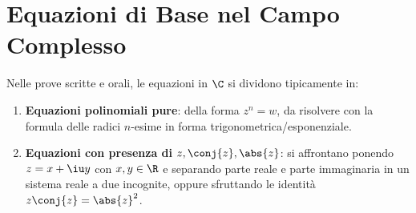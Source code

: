 \section{Equazioni di Base nel Campo Complesso}
\begin{esame}
Nelle prove scritte e orali, le equazioni in $\C$ si dividono tipicamente in:
\begin{enumerate}
    \item \textbf{Equazioni polinomiali pure}: della forma $z^n = w$, da risolvere con la formula delle radici $n$-esime in forma trigonometrica/esponenziale.
    \item \textbf{Equazioni con presenza di $z, \conj{z}, \abs{z}$}: si affrontano ponendo $z = x + \iu y$ con $x, y \in \R$ e separando parte reale e parte immaginaria in un sistema reale a due incognite, oppure sfruttando le identità $z \conj{z} = \abs{z}^2$.
\end{enumerate}
\end{esame}
